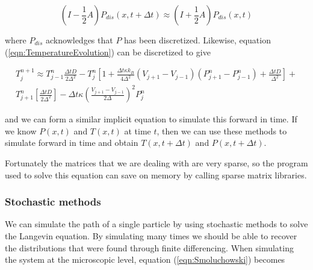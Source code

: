 \documentclass[11pt]{article} %
\begin{document}
\begin{equation}
\left (I - \frac{1}{2} A \right) P_{dis}(x, t + \Delta t) \approx \left(I + \frac{1}{2}A \right)P_{dis}(x, t)
\end{equation}

where $P_{dis}$ acknowledges that $P$ has been discretized. Likewise, equation (\ref{eqn:TemperatureEvolution}) can be discretized to give

\begin{multline}
T^{n+1}_j \approx T^n_{j-1} \frac{\Delta t D}{2 \Delta^2} - T^n_j \left[1 + \frac{\Delta t \kappa k_B}{4 \Delta^2}(V_{j+1} - V_{j-1})(P^n_{j+1} - P^n_{j-1}) + \frac{\Delta t D}{\Delta^2} \right] + \\
 T^n_{j+1} \left [\frac{\Delta t D}{2 \Delta^2} \right] - \Delta t \kappa \left(\frac{V_{j+1} - V_{j-1}}{2 \Delta} \right )^2 P^n_j
\end{multline}

and we can form a similar implicit equation to simulate this forward in time. If we know $P(x, t)$ and $T(x, t)$ at time $t$, then we can use these methods to simulate forward in time and obtain $T(x, t + \Delta t)$ and $P(x, t + \Delta t)$.

Fortunately the matrices that we are dealing with are very sparse, so the program used to solve this equation can save on memory by calling sparse matrix libraries.

%
%
\subsubsection{Stochastic methods}
We can simulate the path of a single particle by using stochastic methods to solve the Langevin equation. By simulating many times we should be able to recover the distributions that were found through finite differencing. When simulating the system  at the microscopic level, equation (\ref{eqn:Smoluchowski}) becomes \cite{Reimann2001}
\end{document}
